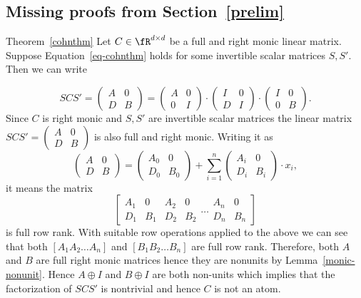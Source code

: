 \subsection{Missing proofs from Section~\ref{prelim}}

\begin{proofof}{Theorem~\ref{cohnthm}}
Let $C\in\fR^{d\times d}$ be a full and right monic linear
matrix. Suppose Equation~\ref{eq-cohnthm} holds for some invertible
scalar matrices $S,S'$. Then we can write

\[
SCS'=  \left(
\begin{array}{cc}
A & 0 \\
D & B
\end{array}
\right) =   \left(
\begin{array}{cc}
A & 0 \\
0 & I
\end{array}
\right)\cdot 
  \left(
\begin{array}{cc}
I & 0 \\
D & I
\end{array}
\right)\cdot
\left(
\begin{array}{cc}
I & 0 \\
0 & B
\end{array}
\right).
\]
Since $C$ is right monic and $S, S'$ are invertible scalar matrices
the linear matrix $SCS'=\left(\begin{array}{cc} A & 0 \\ D & B
\end{array}\right)$ is also full and right monic. Writing it as
\[
\left(
\begin{array}{cc}
A & 0 \\
D & B
\end{array}
\right) =   \left(
\begin{array}{cc}
A_0 & 0 \\
D_0 & B_0
\end{array}
\right) + \sum_{i=1}^n \left(
\begin{array}{cc}
A_i & 0 \\
D_i & B_i
\end{array}
\right)\cdot x_i,
\]
it means the matrix
\[
\left[
\begin{array}{cc|}
A_1 & 0 \\
D_1 & B_1
\end{array}
\begin{array}{cc|}
A_2 & 0 \\
D_2 & B_2
\end{array}
 \ldots
\begin{array}{|cc}
A_n & 0 \\
D_n & B_n
\end{array}
\right]
\]
is full row rank. With suitable row operations applied to the above we
can see that both $[A_1 A_2\ldots A_n]$ and $[B_1 B_2 \ldots B_n]$ are
full row rank. Therefore, both $A$ and $B$ are full right monic
matrices hence they are nonunits by Lemma~\ref{monic-nonunit}.  Hence $A\oplus I$ and $B\oplus I$ are both non-units  which
implies that the factorization of $SCS'$ is nontrivial and hence $C$
is not an atom. 


\end{proofof}
